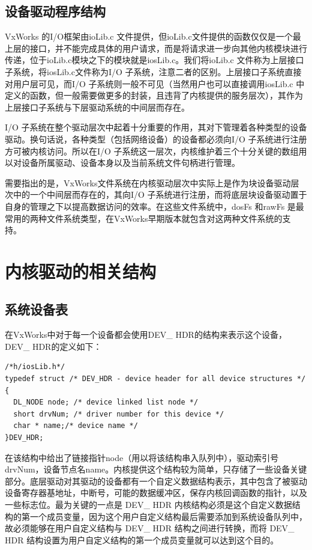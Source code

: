 \subsection{设备驱动程序结构}
	VxWorks 的I/O框架由ioLib.c 文件提供，但ioLib.c文件提供的函数仅仅是一个最上层的接口，并不能完成具体的用户请求，而是将请求进一步向其他内核模块进行传递，位于ioLib.c模块之下的模块就是iosLib.c。我们将ioLib.c 文件称为上层接口子系统，将iosLib.c文件称为I/O 子系统，注意二者的区别。上层接口子系统直接对用户层可见，而I/O 子系统则一般不可见（当然用户也可以直接调用iosLib.c 中定义的函数，但一般需要做更多的封装，且违背了内核提供的服务层次），其作为上层接口子系统与下层驱动系统的中间层而存在。
	

	I/O 子系统在整个驱动层次中起着十分重要的作用，其对下管理着各种类型的设备驱动。换句话说，各种类型（包括网络设备）的设备都必须向I/O 子系统进行注册方可被内核访问。所以在I/O 子系统这一层次，内核维护着三个十分关键的数组用以对设备所属驱动、设备本身以及当前系统文件句柄进行管理。

	需要指出的是，VxWorks文件系统在内核驱动层次中实际上是作为块设备驱动层次中的一个中间层而存在的，其向I/O 子系统进行注册，而将底层块设备驱动置于自身的管理之下以提高数据访问的效率。在这些文件系统中，dosFs 和rawFs 是最常用的两种文件系统类型，在VxWorks早期版本就包含对这两种文件系统的支持。
	
\section{内核驱动的相关结构}
\subsection{系统设备表}
	
	在VxWorks中对于每一个设备都会使用DEV\_ HDR的结构来表示这个设备，DEV\_ HDR的定义如下：
\lstset{language=C}
\begin{lstlisting}
/*h/iosLib.h*/
typedef struct /* DEV_HDR - device header for all device structures */ 
{ 
  DL_NODE node; /* device linked list node */ 
  short drvNum; /* driver number for this device */ 
  char * name;/* device name */ 
}DEV_HDR;  
\end{lstlisting}

	在该结构中给出了链接指针node（用以将该结构串入队列中），驱动索引号drvNum，设备节点名name。内核提供这个结构较为简单，只存储了一些设备关键部分。底层驱动对其驱动的设备都有一个自定义数据结构表示，其中包含了被驱动设备寄存器基地址，中断号，可能的数据缓冲区，保存内核回调函数的指针，以及一些标志位。最为关键的一点是 DEV\_ HDR 内核结构必须是这个自定义数据结构的第一个成员变量，因为这个用户自定义结构最后需要添加到系统设备队列中，故必须能够在用户自定义结构与 DEV\_ HDR 结构之间进行转换，而将 DEV\_ HDR 结构设置为用户自定义结构的第一个成员变量就可以达到这个目的。
	
